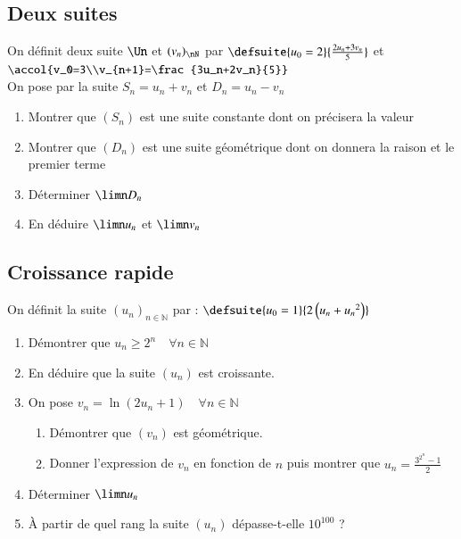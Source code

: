 \documentclass[oneside,12pt]{article}          %
\begin{document}
\subsection{Deux suites}
On définit deux suite $\Un$ et $(v_n)_{\nN}$ par $\defsuite{u_0=2}{\frac{2u_n+3v_n}{5}}$ et $\accol{v_0=3\\v_{n+1}=\frac{3u_n+2v_n}{5}}$\\
On pose par la suite $S_n=u_n+v_n$ et $D_n=u_n-v_n$
\begin{enumerate}
    \item Montrer que $(S_n)$ est une suite constante dont on précisera la valeur
    \item Montrer que $(D_n)$ est une suite géométrique dont on donnera la raison et le premier terme
    \item Déterminer $\limn D_n$
    \item En déduire $\limn u_n$ et $\limn v_n$
\end{enumerate}



\subsection{Croissance rapide}
On définit la suite $(u_n)_{n \in \mathbb{N}}$ par : $\defsuite{u_0=1}{2\left(u_n+{u_n}^2\right)}$
\begin{enumerate}
    \item Démontrer que $u_n \geq 2^n \quad \forall n \in \mathbb{N}$
    \item En déduire que la suite $(u_n)$ est croissante.
    \item On pose $v_n = \ln(2u_n + 1) \quad \forall n \in \mathbb{N}$
    \begin{enumerate}
        \item Démontrer que $(v_n)$ est géométrique.
        \item Donner l'expression de $v_n$ en fonction de $n$ puis montrer que $u_n=\frac{3^{2^n}-1}{2}$
    \end{enumerate}
    \item Déterminer $\limn u_n$
    \item À partir de quel rang la suite $(u_n)$ dépasse-t-elle $10^{100}$ ?
\end{enumerate}
\end{document}
